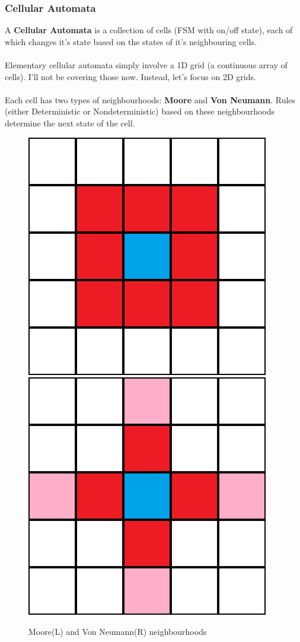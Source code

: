 \documentclass[handout]{beamer}
\begin{document}
\begin{frame}
\frametitle{Cellular Automata}
\begin{flushleft}
A \textbf{Cellular Automata} is a collection of cells (FSM with on/off state),
each of which changes it's state based on the states of it's neighbouring cells. \\~\\
\pause
Elementary cellular automata simply involve a 1D grid (a continuous array 
of cells). I'll not be covering those now. Instead, let's focus on 2D grids. \\~\\
\pause
Each cell has two types of neighbourhoods: \textbf{Moore} and \textbf{Von Neumann}. 
Rules (either Deterministic or Nondeterministic) based on these neighbourhoods 
determine the next state of the cell.
\end{flushleft}

\begin{center}
\begin{figure}
\includegraphics[scale=0.15]{img/moore_nbd}
\hspace{5em}
\includegraphics[scale=0.15]{img/vn_nbd}
\caption{Moore(L) and Von Neumann(R) neighbourhoods}
\end{figure}
\end{center}


\end{frame}
\end{document}
